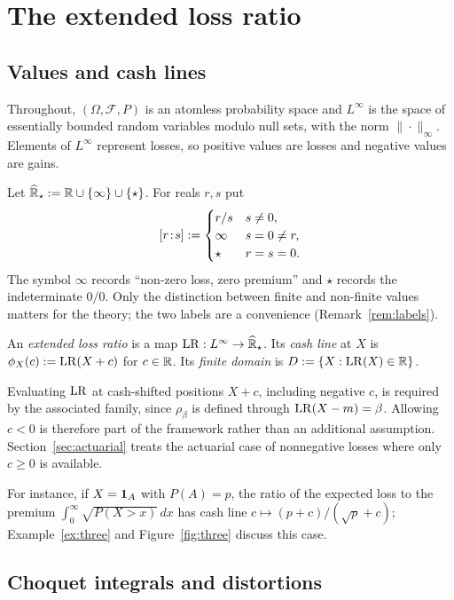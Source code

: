 \section{The extended loss ratio}\label{sec:setting}

\subsection{Values and cash lines}

Throughout, $(\Omega,\mathcal F,P)$ is an atomless probability space and $L^\infty$ is the space of essentially
bounded random variables modulo null sets, with the norm $\|\cdot\|_\infty$. Elements of $L^\infty$ represent losses,
so positive values are losses and negative values are gains.

Let $\widehat{\mathbb R}_\star:=\mathbb R\cup\{\infty\}\cup\{\star\}$. For reals $r,s$ put
\[
 [r\!:\!s]:=\begin{cases} r/s & s\neq0,\\ \infty & s=0\neq r,\\ \star & r=s=0.\end{cases}
\]
The symbol $\infty$ records ``non-zero loss, zero premium'' and $\star$ records the indeterminate $0/0$. Only
the distinction between finite and non-finite values matters for the theory; the two labels are a
convenience (Remark~\ref{rem:labels}).

\begin{definition}\label{def:LR}
An \emph{extended loss ratio} is a map $\mathrm{LR}:L^\infty\to\widehat{\mathbb R}_\star$. Its \emph{cash line} at
$X$ is $\phi_X(c):=\mathrm{LR}(X+c)$ for $c\in\mathbb R$. Its \emph{finite domain} is $D:=\{X:\mathrm{LR}(X)\in\mathbb R\}$.
\end{definition}

Evaluating $\mathrm{LR}$ at cash-shifted positions $X+c$, including negative $c$, is required by
the associated family, since $\rho_\beta$ is defined through $\mathrm{LR}(X-m)=\beta$. Allowing $c<0$ is therefore part
of the framework rather than an additional assumption.
Section~\ref{sec:actuarial} treats the actuarial case of nonnegative losses where only $c\ge0$ is
available.

For instance, if $X=\mathbf 1_A$ with $P(A)=p$, the ratio of the expected loss to the premium
$\int_0^\infty\sqrt{P(X>x)}\,dx$ has cash line $c\mapsto(p+c)/(\sqrt p+c)$; Example~\ref{ex:three} and
Figure~\ref{fig:three} discuss this case.

\subsection{Choquet integrals and distortions}


